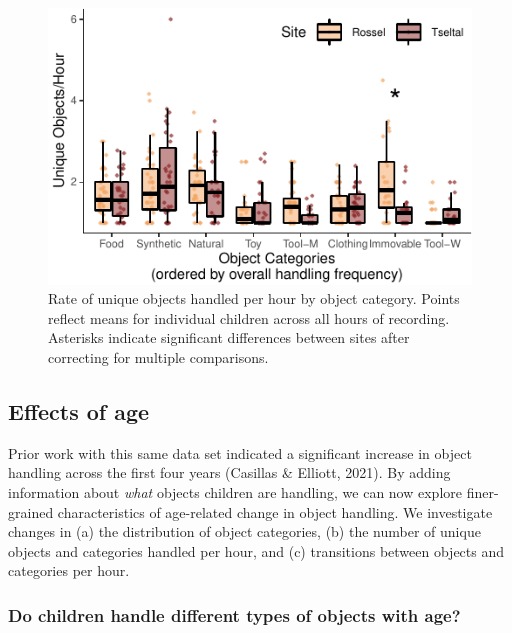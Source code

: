 \documentclass[10pt, letterpaper]{article}
\newenvironment{CodeChunk}{}{}
\begin{document}
\begin{CodeChunk}
\begin{figure}[!h]

\includegraphics{figs/overall-stats-fig-1} \hfill{}

\caption[Rate of unique objects handled per hour by object category]{Rate of unique objects handled per hour by object category. Points reflect means for individual children across all hours of recording. Asterisks indicate significant differences between sites after correcting for multiple comparisons.}\label{fig:overall-stats-fig}
\end{figure}
\end{CodeChunk}

\hypertarget{effects-of-age}{%
\subsection{Effects of age}\label{effects-of-age}}

Prior work with this same data set indicated a significant increase in
object handling across the first four years (Casillas \& Elliott, 2021).
By adding information about \emph{what} objects children are handling,
we can now explore finer-grained characteristics of age-related change
in object handling. We investigate changes in (a) the distribution of
object categories, (b) the number of unique objects and categories
handled per hour, and (c) transitions between objects and categories per
hour.

\hypertarget{do-children-handle-different-types-of-objects-with-age}{%
\subsubsection{Do children handle different types of objects with
age?}\label{do-children-handle-different-types-of-objects-with-age}}
\end{document}
